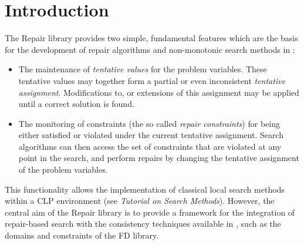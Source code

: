 %
% 
% 
% 
% 

%

\section{Introduction}

The Repair library provides two simple, fundamental features which are
the basis for the development of repair algorithms and non-monotonic
search methods in {\eclipse}:
\begin{itemize}
\item The maintenance of {\em tentative values} for the problem variables.
    These tentative values may together form a partial
    or even inconsistent {\em tentative assignment}. 
    Modifications to, or extensions of this assignment may be
    applied until a correct solution is found.

\item The monitoring of constraints (the so called {\em repair constraints})
    for being either satisfied or violated under the current tentative
    assignment.  Search algorithms can then access the set of
    constraints that are violated at any point in the search,
    and perform repairs by changing the tentative assignment
    of the problem variables.
\end{itemize}
This functionality allows the implementation of classical local search
methods within a CLP environment (see {\em Tutorial on Search Methods}).
However, the central aim of the Repair library is to provide a framework
for the integration of repair-based search with the consistency techniques
available in {\eclipse}, such as the domains and constraints of the FD library.

